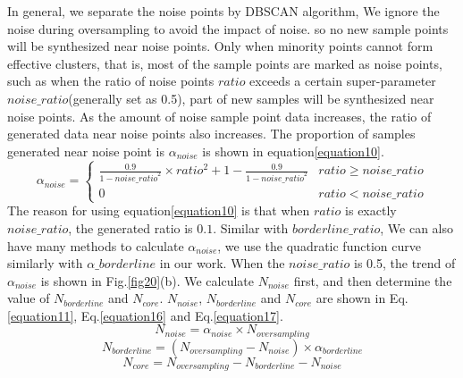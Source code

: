 \documentclass[runningheads]{llncs}
\begin{document}
In general, 
we separate the noise points by DBSCAN algorithm,
We ignore the noise during oversampling to avoid the impact of noise.
so no new sample points will be synthesized near noise points.
Only when minority points cannot form effective clusters, that is,
most of the sample points are marked as noise points, 
such as when the ratio of noise points $ratio$ exceeds a certain 
super-parameter $noise\_ratio$(generally set as 0.5),
part of new samples will be synthesized near noise points.
As the amount of noise sample point data increases, 
the ratio of generated data near noise points also increases. 
The proportion of samples generated near noise point
 is $\alpha_{noise}$ is shown in equation\ref{equation10}.
\begin{equation}
  \label{equation10}
  \alpha_{noise}=
  \begin{cases}
  \frac{0.9}{1-{noise\_{ratio}}^2}\times ratio^2+1-\frac{0.9}{1-{noise\_ratio}^2} & ratio \ge noise\_ratio\\
  0                                                                               & ratio < noise\_ratio
  \end{cases}
\end{equation}
The reason for using equation\ref{equation10} is that when $ratio$ is exactly
$noise\_ratio$, the generated ratio is $0.1$. Similar with $borderline\_ratio$,
We can also have many methods to calculate $\alpha_{noise}$,
we use the quadratic function curve similarly with $\alpha\_borderline$ in our work.
When the $noise\_ratio$ is 0.5, the trend of $\alpha_{noise}$ is shown in Fig.\ref{fig20}(b).
We calculate $N_{noise}$ first, and then determine the value of $N_{borderline}$ and $N_{core}$.
$N_{noise}$, $N_{borderline}$ 
and $N_{core}$ are shown in Eq.\ref{equation11}, Eq.\ref{equation16}
and Eq.\ref{equation17}.
\begin{equation}
  \label{equation11}
  N_{noise}=\alpha_{noise} \times N_{oversampling}
\end{equation}
\begin{equation}
  \label{equation16}
  N_{borderline}=(N_{oversampling}-N_{noise})\times \alpha_{borderline}
\end{equation}
\begin{equation}
  \label{equation17}
  N_{core}=N_{oversampling}-N_{borderline}-N_{noise}
\end{equation}
\end{document}
